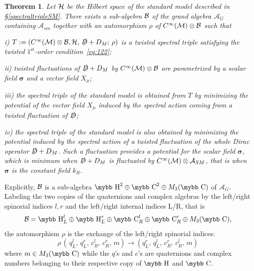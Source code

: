 \documentclass[11pt]{article}
\newcommand{\cinf}{{C^\infty({\cal M})}}
\newcommand{\A}{\mathcal A}
\newcommand{\Ds}{\slashed D}
\newcommand{\sig}{{\boldsymbol{\sigma}}}
\def\bb#1{\hbox{\mybb#1}}
\newtheorem{thm}[prop]{Theorem}
\begin{document}
\begin{thm}
\label{theo1}
Let $\cal H$ be the Hilbert space of the standard model described in
\S \ref{spectraltripleSM}.
There exists 
 a sub-algebra ${\cal B}$ of the grand algebra $\A_G$
  containing $\A_{sm}$ together with an automorphism $\rho$ of $\cinf\otimes{\cal B}$
such that
\smallskip 

i)  $T:= (\cinf\otimes{\cal B}, {\cal H}, \,\Ds + D_M;\,\rho)$ is a twisted
spectral triple satisfying the twisted $1^{\text{st}}$-order
condition~\eqref{eq:122};
\smallskip

ii) twisted
fluctuations of $\Ds + D_M$ by $\cinf \otimes\cal
B$ are parametrized by a scalar field $\boldsymbol \sigma$
and a vector field $X_\mu$; 
\smallskip

iii) the
spectral triple of the standard model is obtained from $T$ by
minimizing the potential of the vector field $X_\mu$ induced by the
spectral action coming from a twisted fluctuation of $\Ds$;

iv) the spectral triple of the standard model is also obtained by
minimizing the potential induced by the spectral action of a
twisted fluctuation of the whole Dirac operator $\Ds +D_M$. Such a
fluctuation provides a potential for the scalar field $\sig$, which is
minimum when $\Ds+D_M$ is fluctuated by $\cinf\otimes\A_{SM}$, that is when $\sig$
is the constant field $k_R$. 
\end{thm}

\noindent Explicitly, $\cal B$ is a sub-algebra $\bb H^2 \oplus \bb C^2
\oplus M_3(\bb C)$ of $\A_G$. Labeling the two copies of the
quaternions and complex algebras by the left/right spinorial indices $l,r$ and the left/right
internal indices L/R, that is 
\begin{equation}
  \label{eq:128}
  {\cal B} = {\bb H}^l_L \oplus {\bb H}^r_L \oplus {\bb C}^l_R \oplus {\bb
    C}^r_R \oplus M_3(\bb C),
\end{equation}
the automorphism $\rho$ is the exchange of the left/right spinorial indices:
\begin{equation}
  \label{eq:133}
  \rho\,(\,q^l_L,\, q^r_L,\, c^l_R,\, c^r_R,\, m) \to (q^r_L,\, q^l_L,\,
  c^r_R,\, c^l_R,\, m)
\end{equation}
where $m\in M_3({\bb C})$ while the $q$'s and $c$'s are quaternions and
complex numbers belonging to their
respective copy of $\bb H$ and $\bb C$.  
\bigskip
\end{document}
